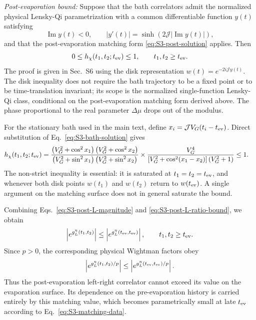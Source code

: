 \documentclass[11pt,a4paper]{article}
\begin{document}
\textit{Post-evaporation bound:}
Suppose that the bath correlators admit the normalized physical Lensky-Qi
parametrization with a common differentiable function \(y(t)\) satisfying
\begin{equation}
\operatorname{Im}y(t)<0,
\qquad
|y'(t)|
=
\sinh\left(
2\mathcal J|\operatorname{Im}y(t)|
\right),
\label{eq:S3-LQ-bound-assumptions}
\end{equation}
and that the post-evaporation matching form
\eqref{eq:S3-post-solution} applies. Then
\begin{equation}
0
\leq
h_\chi(t_1,t_2;t_{\rm ev})
\leq
1,
\qquad
t_1,t_2\geq t_{\rm ev}.
\label{eq:S3-post-L-ratio-bound}
\end{equation}
The proof is given in Sec.~S6 using the disk representation
\(w(t)=e^{-2i\mathcal J y(t)}\). The disk inequality does not require the
bath trajectory to be a fixed point or to be time-translation invariant;
its scope is the normalized single-function Lensky-Qi class, conditional on
the post-evaporation matching form derived above. The phase proportional to
the real parameter \(\Delta\mu\) drops out of the modulus.

For the stationary bath used in the main text, define
\(x_i=\mathcal J V_G(t_i-t_{\rm ev})\). Direct substitution of
Eq.~\eqref{eq:S3-bath-solution} gives
\begin{equation}
\begin{aligned}
h_\chi(t_1,t_2;t_{\rm ev})
&=
\frac{
\left(V_G^2+\cos^2x_1\right)
\left(V_G^2+\cos^2x_2\right)
}{
\left(V_G^2+\sin^2x_1\right)
\left(V_G^2+\sin^2x_2\right)
}
\times
\frac{V_G^4}{
\left[V_G^2+\cos^2(x_1-x_2)\right]
\left(V_G^2+1\right)
}
\leq1 .
\end{aligned}
\label{eq:S3-post-L-bound-factor}
\end{equation}
The non-strict inequality is essential: it is saturated at \(t_1=t_2=t_{\rm ev}\), and whenever both disk points
\(w(t_1)\) and \(w(t_2)\) return to \(w(t_{\rm ev})\). A single
argument on the matching surface does not in general saturate the bound.

Combining Eqs.~\eqref{eq:S3-post-L-magnitude} and
\eqref{eq:S3-post-L-ratio-bound}, we obtain
\begin{equation}
\left|e^{g^\eta_L(t_1,t_2)}\right|
\leq
\left|e^{g^\eta_L(t_{\rm ev},t_{\rm ev})}\right|,
\qquad
t_1,t_2\geq t_{\rm ev}.
\label{eq:S3-post-L-bound}
\end{equation}
Since \(p>0\), the corresponding physical Wightman factors obey
\begin{equation}
\left|e^{g^\eta_L(t_1,t_2)/p}\right|
\leq
\left|e^{g^\eta_L(t_{\rm ev},t_{\rm ev})/p}\right|.
\end{equation}
Thus the post-evaporation left-right correlator cannot exceed its value on
the evaporation surface. Its dependence on the pre-evaporation history is
carried entirely by this matching value, which becomes parametrically small
at late \(t_{\rm ev}\) according to Eq.~\eqref{eq:S3-matching-data}.
\end{document}
